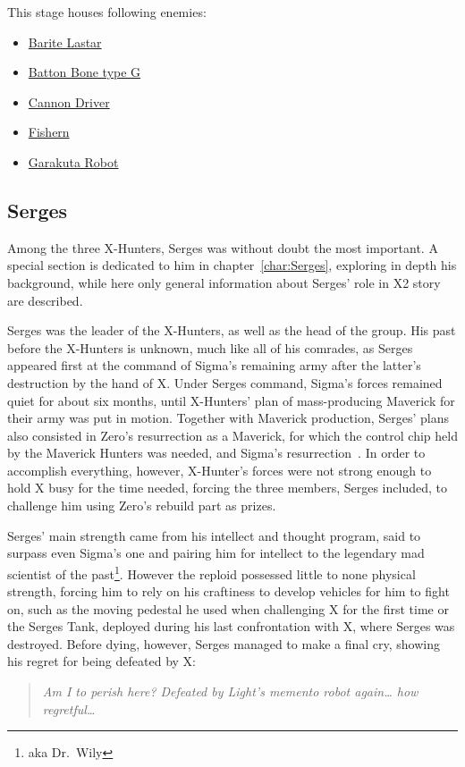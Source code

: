 This stage houses following enemies:
\begin{itemize}
	\item \hyperlink{enem:Barite_Lastar}{Barite Lastar}
	\item \hyperlink{enem:Batton_Bone_type_G}{Batton Bone type G}
	\item \hyperlink{enem:Cannon_Driver}{Cannon Driver}
	\item \hyperlink{enem:Fishern}{Fishern}
	\item \hyperlink{enem:Garakuta_Robot}{Garakuta Robot}
\end{itemize}

\subsection{Serges}\label{boss:Serges}
Among the three X-Hunters, Serges was without doubt the most important. A special section is dedicated to him in chapter~\ref{char:Serges}, exploring in depth his background, while here only general information about Serges' role in X2 story are described.

Serges was the leader of the X-Hunters, as well as the head of the group. His past before the X-Hunters is unknown, much like all of his comrades, as Serges appeared first at the command of Sigma's remaining army after the latter's destruction by the hand of X. Under Serges command, Sigma's forces remained quiet for about six months, until X-Hunters' plan of mass-producing Maverick for their army was put in motion. Together with Maverick production, Serges' plans also consisted in Zero's resurrection as a Maverick, for which the control chip held by the Maverick Hunters was needed, and Sigma's resurrection~\cite{wayback:X2_resources}. In order to accomplish everything, however, X-Hunter's forces were not strong enough to hold X busy for the time needed, forcing the three members, Serges included, to challenge him using Zero's rebuild part as prizes. 

Serges' main strength came from his intellect and thought program, said to surpass even Sigma's one and pairing him for intellect to the legendary mad scientist of the past\footnote{aka Dr.~Wily}. However the reploid possessed little to none physical strength, forcing him to rely on his craftiness to develop vehicles for him to fight on, such as the moving pedestal he used when challenging X for the first time or the Serges Tank, deployed during his last confrontation with X, where Serges was destroyed. Before dying, however, Serges managed to make a final cry, showing his regret for being defeated by X:
\begin{quote}
	\textit{Am I to perish here? Defeated by Light’s memento robot again… how regretful…}~\cite{wordpress:X2_japanese_script}
\end{quote}



